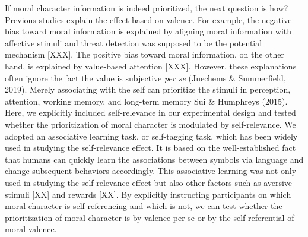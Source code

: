 \documentclass[
  man]{apa6}
\begin{document}
If moral character information is indeed prioritized, the next question is how? Previous studies explain the effect based on valence. For example, the negative bias toward moral information is explained by aligning moral information with affective stimuli and threat detection was supposed to be the potential mechanism {[}XXX{]}. The positive bias toward moral information, on the other hand, is explained by value-based attention {[}XXX{]}. However, these explanations often ignore the fact the value is subjective \emph{per se} (Juechems \& Summerfield, 2019). Merely associating with the self can prioritize the stimuli in perception, attention, working memory, and long-term memory Sui \& Humphreys (2015). Here, we explicitly included self-relevance in our experimental design and tested whether the prioritization of moral character is modulated by self-relevance. We adopted an associative learning task, or self-tagging task, which has been widely used in studying the self-relevance effect. It is based on the well-established fact that humans can quickly learn the associations between symbols via language and change subsequent behaviors accordingly. This associative learning was not only used in studying the self-relevance effect but also other factors such as aversive stimuli {[}XX{]} and rewards {[}XX{]}. By explicitly instructing participants on which moral character is self-referencing and which is not, we can test whether the prioritization of moral character is by valence per se or by the self-referential of moral valence.
\end{document}
